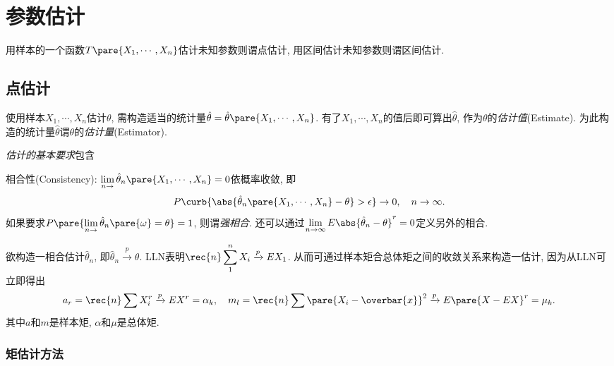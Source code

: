 \documentclass[../Statistics.tex]{subfiles}
\begin{document}
\section{参数估计} %
\label{sec:参数估计}

用样本的一个函数$T\pare{X_1,\cdots,X_n}$估计未知参数则谓点估计, 用区间估计未知参数则谓区间估计.

\subsection{点估计} %
\label{sub:点估计}

使用样本$X_1,\cdots,X_n$估计$\theta$, 需构造适当的统计量$\hat\theta = \hat\theta\pare{X_1,\cdots,X_n}$. 有了$X_1,\cdots,X_n$的值后即可算出$\hat\theta$, 作为$\theta$的\emph{估计值}(Estimate). 为此构造的统计量$\hat\theta$谓$\theta$的\emph{估计量}(Estimator).
\par
\emph{估计的基本要求}包含
\begin{cenum}
    \item 相合性(Consistency): $\displaystyle \lim_{n\rightarrow}\hat\theta_n\pare{X_1,\cdots,X_n} = 0$依概率收敛, 即
    \[ P\curb{\abs{\hat\theta_n\pare{X_1,\cdots,X_n} - \theta} > \epsilon} \rightarrow 0,\quad n\rightarrow\infty. \]
    如果要求$\displaystyle P\pare{\lim_{n\rightarrow}\hat\theta_n\pare{\omega} = \theta} = 1$, 则谓\emph{强相合}. 还可以通过$\displaystyle \lim_{n\rightarrow\infty} E\abs{\hat\theta_n - \theta}^r = 0$定义另外的相合.
\end{cenum}
欲构造一相合估计$\hat\theta_n$, 即$\hat\theta_n\xrightarrow{p} \theta$. LLN表明$\displaystyle \rec{n} \sum_{1}^n X_i \xrightarrow{p} EX_1$. 从而可通过样本矩合总体矩之间的收敛关系来构造一估计, 因为从LLN可立即得出
\[ a_r = \rec{n} \sum X_i^r \xrightarrow{p} EX^r = \alpha_k,\quad m_l = \rec{n} \sum \pare{X_i - \overbar{x}}^2 \xrightarrow{p} E\pare{X - EX}^r = \mu_k. \]
其中$a$和$m$是样本矩, $\alpha$和$\mu$是总体矩.

\subsubsection{矩估计方法} %
\label{ssub:矩估计方法}
\end{document}
